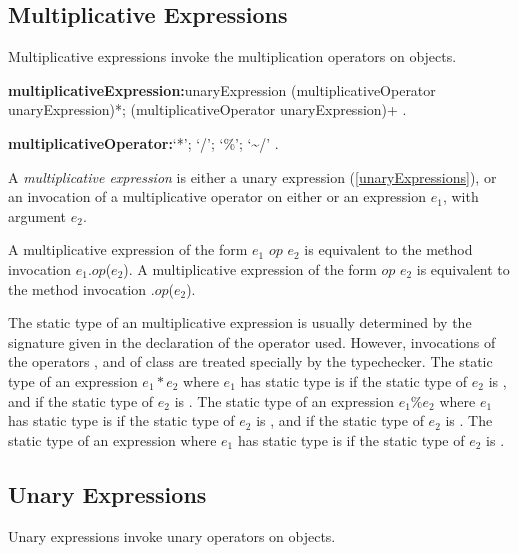 \documentclass{article}
\newcommand{\code}[1]{{\sf #1}}
\begin{document}
\subsection{ Multiplicative Expressions}

\LMHash{}
Multiplicative expressions invoke the multiplication operators on objects.

 \begin{grammar}
{\bf multiplicativeExpression:}unaryExpression (multiplicativeOperator unaryExpression)*;
      \SUPER{} (multiplicativeOperator unaryExpression)+
    .

{\bf multiplicativeOperator:}`*';
      `/';
      `\%';
      `\~{}/'
    .

 \end{grammar}

\LMHash{}
 A {\em multiplicative expression} is either a unary expression (\ref{unaryExpressions}), or an invocation of a multiplicative operator on either \SUPER{} or an expression $e_1$, with argument $e_2$.

\LMHash{}
 A multiplicative expression of the form  $e_1$ $op$ $e_2$ is equivalent to the method invocation \code{$e_1$.$op$($e_2$)}. A multiplicative expression of the form  \SUPER{} $op$ $e_2$ is equivalent to the method invocation \code{\SUPER{}.$op$($e_2$)}.

\LMHash{}
The static type of an multiplicative expression is usually determined by the signature given in the declaration of the operator used. However, invocations of the operators \cd{*}, \cd{\%}  and \cd{\~{}/} of class  are treated specially by the typechecker. The static type of an expression $e_1 * e_2$ where $e_1$ has static type  is  if the static type of $e_2$ is , and  if the static type of $e_2$ is . The static type of an expression $e_1 \% e_2$ where $e_1$ has static type  is  if the static type of $e_2$ is , and  if the static type of $e_2$ is .  The static type of an expression  where $e_1$ has static type  is  if the static type of $e_2$ is .

\subsection{ Unary Expressions}

\LMHash{}
Unary expressions invoke unary operators on objects.
\end{document}
